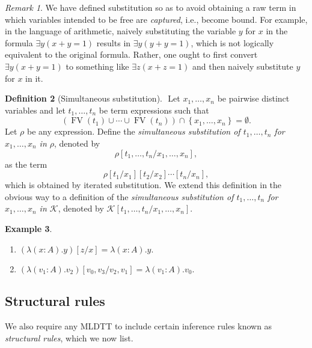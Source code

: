 \documentclass[10pt,letterpaper,cm]{nupset}
\theoremstyle{definition}
\newtheorem{definition}{Definition}[subsection]
\newtheorem{exmp}[definition]{Example}
\theoremstyle{theorem}
\theoremstyle{remark}
\newtheorem{remark}[definition]{Remark}
\newcommand{\K}{\mathcal K}
\newcommand{\0}{\mathbf{0}}
\newcommand{\1}{\mathbf{1}}
\newcommand{\2}{\mathbf{2}}
\DeclareMathOperator{\fv}{FV}
\newcommand{\be}{\begin{enumerate}}
\newcommand{\ee}{\end{enumerate}}
\begin{document}
\begin{remark}
We have defined substitution so as to avoid obtaining a raw term in which variables intended to be free are \textit{captured}, i.e., become bound. 
For example, in the language of arithmetic, naively substituting the variable $y$ for $x$ in the formula $\exists y(x+y=1) $ results in $\exists y(y+y=1)$, which is not logically equivalent to the original formula. Rather, one ought to first convert $\exists y(x+y=1) $ to something like $\exists z(x+z=1)$ and then naively substitute $y$ for $x$ in it.
\end{remark}

\begin{definition}[Simultaneous substitution]\label{ssub} $ $
Let $x_1, \ldots, x_n$ be pairwise distinct variables and let $t_1, \ldots, t_n$ be term expressions such that $$\left(\fv(t_1) \cup \cdots \cup \fv(t_n)\right) \cap \left\{x_1, \ldots, x_n\right\} =\emptyset.$$ Let $\rho$ be any expression. Define the \textit{simultaneous substitution of   $t_1, \ldots, t_n$ for $x_1, \ldots, x_n$ in $\rho$}, denoted by $$ \rho\left[t_1, \ldots, t_n / x_1, \ldots, x_n\right]   ,$$  as the term  $$ \rho\left[t_1/x_1\right]\left[t_2/x_2\right]\cdots \left[t_n/x_n\right]     ,$$ which is obtained by iterated substitution. We extend this definition in the obvious way to a definition of the \textit{simultaneous substitution of $t_1, \ldots, t_n$ for $x_1, \ldots, x_n$  in $\K$}, denoted   by $\K\left[t_1, \ldots, t_n / x_1, \ldots, x_n\right]$.
\end{definition}

\begin{exmp} $ $
\be
\item $\left(\lambda (x:A).y\right)[z/x] =\lambda (x:A).y.$
\item $\left(\lambda (v_1:A).v_2\right)\left[v_0, v_3/ v_2, v_1\right] = \lambda(v_1:A).v_0$. 
\ee
\end{exmp}

\subsection{Structural rules} 
We also require any  MLDTT to include certain inference rules known as \textit{structural rules}, which we now list.

\smallskip
\end{document}

